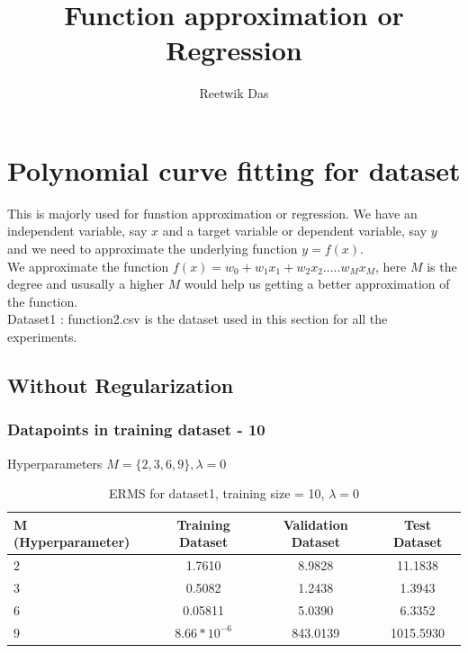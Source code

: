 \documentclass[11pt]{article}
\title{Function approximation or Regression}
\author{Reetwik Das}
\begin{document}
\maketitle
\newpage
\tableofcontents
\listoftables
\listoffigures

\newpage 

\section{Polynomial curve fitting for dataset}
This is majorly used for funstion approximation or regression. We have an independent variable, say $x$ and a target variable or dependent variable, say $y$ and we need to approximate the underlying function $ y = f(x)$.\\
We approximate the function $f(x) = w_{0}+w_{1}x_1 + w_2x_{2} ..... w_Mx_M$, here $M$ is the degree and ususally a higher $M$ would help us getting a better approximation of the function.\\

Dataset1 : function2.csv is the dataset used in this section for all the experiments.

\subsection{Without Regularization}
\subsubsection{Datapoints in training dataset - 10}
Hyperparameters $M = \{2,3,6,9\}, \lambda = 0$
\begin{table}[h!]
\label{tab:tab1.1.1}
\begin{center}
\begin{tabular}{|l|c|c|c|}
\hline
\textbf{M (Hyperparameter)} & \textbf{Training Dataset} & \textbf{Validation Dataset} &\textbf{Test Dataset}\\
\hline
$2$ & 1.7610 & 8.9828 & 11.1838\\
\hline
$3$ & 0.5082 & 1.2438 & 1.3943\\
\hline
$6$ & 0.05811 & 5.0390 & 6.3352\\
\hline
$9$ & $8.66*10^{-6}$ & 843.0139 & 1015.5930\\
\hline
\end{tabular}
\caption{ERMS for dataset1, training size = 10, $\lambda = 0$}
\end{center}
\end{table}
\end{document}
